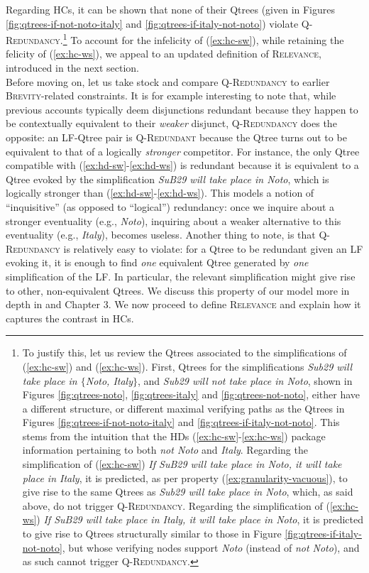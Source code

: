 Regarding HCs, it can be shown that none of their Qtrees (given in Figures \ref{fig:qtrees-if-not-noto-italy} and \ref{fig:qtrees-if-italy-not-noto}) violate \textsc{Q-Redundancy}.\footnote{To justify this, let us review the Qtrees associated to the simplifications of (\ref{ex:hc-sw}) and (\ref{ex:hc-ws}). First, Qtrees for the simplifications \textit{Sub29 will take place in $\lbrace$Noto, Italy$\rbrace$}, and \textit{Sub29 will not take place in Noto}, shown in Figures \ref{fig:qtrees-noto}, \ref{fig:qtrees-italy} and \ref{fig:qtrees-not-noto}, either have a different structure, or different maximal verifying paths as the Qtrees in Figures \ref{fig:qtrees-if-not-noto-italy} and \ref{fig:qtrees-if-italy-not-noto}. This stems from the intuition that the HDs (\ref{ex:hc-sw}-\ref{ex:hc-ws}) package information pertaining to both \textit{not Noto} and \textit{Italy}. Regarding the simplification of (\ref{ex:hc-sw}) \textit{If SuB29 will take place in Noto, it will take place in Italy}, it is predicted, as per property (\ref{ex:granularity-vacuous}), to give rise to the same Qtrees as \textit{Sub29 will take place in Noto}, which, as said above, do not trigger \textsc{Q-Redundancy}. Regarding the simplification of (\ref{ex:hc-ws}) \textit{If SuB29 will take place in Italy, it will take place in Noto}, it is predicted to give rise to Qtrees structurally similar to those in Figure \ref{fig:qtrees-if-italy-not-noto}, but whose verifying nodes support \textit{Noto} (instead of \textit{not Noto}), and as such cannot trigger \textsc{Q-Redundancy}.} To account for the infelicity of (\ref{ex:hc-sw}), while retaining the felicity of (\ref{ex:hc-ws}), we appeal to an updated definition of \textsc{Relevance}, introduced in the next section.\\

Before moving on, let us take stock and compare \textsc{Q-Redundancy} to earlier \textsc{Brevity}-related constraints. It is for example interesting to note that, while previous accounts typically deem disjunctions redundant because they happen to be contextually equivalent to their \textit{weaker} disjunct, \textsc{Q-Redundancy} does the opposite: an LF-Qtree pair is \textsc{Q-Redundant} because the Qtree turns out to be equivalent to that of a logically \textit{stronger} competitor. For instance, the only Qtree compatible with (\ref{ex:hd-sw}-\ref{ex:hd-ws}) is redundant because it is equivalent to a Qtree evoked by the simplification \textit{SuB29 will take place in Noto}, which is logically stronger than (\ref{ex:hd-sw}-\ref{ex:hd-ws}). This models a notion of ``inquisitive''  (as opposed to ``logical'') redundancy: once we inquire about a stronger eventuality (e.g., \textit{Noto}), inquiring about a weaker alternative to this eventuality (e.g., \textit{Italy}), becomes useless. Another thing to note, is that \textsc{Q-Redundancy} is relatively easy to violate: for a Qtree to be redundant given an LF evoking it, it is enough to find \textit{one} equivalent Qtree generated by \textit{one} simplification of the LF. In particular, the relevant simplification might give rise to other, non-equivalent Qtrees. We discuss this property of our model more in depth in \cite{HenotMortier2024b} and Chapter 3. We now proceed to define \textsc{Relevance} and explain how it captures the contrast in HCs.

